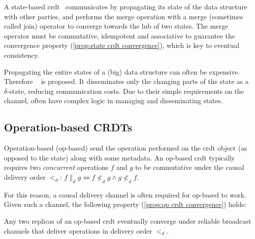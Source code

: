 A state-based 
\acrshort{crdt}~\cite{vanderlinde2016delta-CRDTs,almeida2018DeltaCRDT,shapiro2011CRDT,preguica2018CRDT} communicates by propagating its state of 
the data structure with other parties, and performs the merge operation with a merge
(sometimes called join) operator to converge towards the \acrfull{lub} of
two states. The merge operator must be commutative, idempotent and
associative to guarantee the convergence property (\cref{prop:state crdt convergence}),
which is key to eventual consistency.


Propagating the entire states of a (big) data structure can often be expensive.
Therefore ~\cite{almeida2018DeltaCRDT} is proposed. It
disseminates only the changing parts of the state as 
a \(\delta\)-state, reducing communication costs.
Due to their simple requirements on the channel,  often
have complex logic in managing and disseminating states.


\subsection{Operation-based CRDTs} \label{subsec:bg op-based crdts}

Operation-based (op-based)  send the operation performed on 
the \acrshort{crdt} object (as opposed to the state) along with some metadata.
An op-based \acrshort{crdt} typically requires two \emph{concurrent}
operations \(f\) and \(g\) to 
be commutative under the causal delivery order \(<_d\): 
\(f \parallel_d g \iff f\not <_d g \land g\not <_d f\). 

For this reason, a causal delivery channel is often required for op-based
 to work. Given such a channel,  the following 
property (\cref{prop:op crdt convergence}) holds:

\begin{proposition} \label{prop:op crdt convergence}
  Any two replicas of an op-based \acrshort{crdt} eventually converge under reliable broadcast
  channels that deliver operations in delivery order \(<_d\).
\end{proposition}

